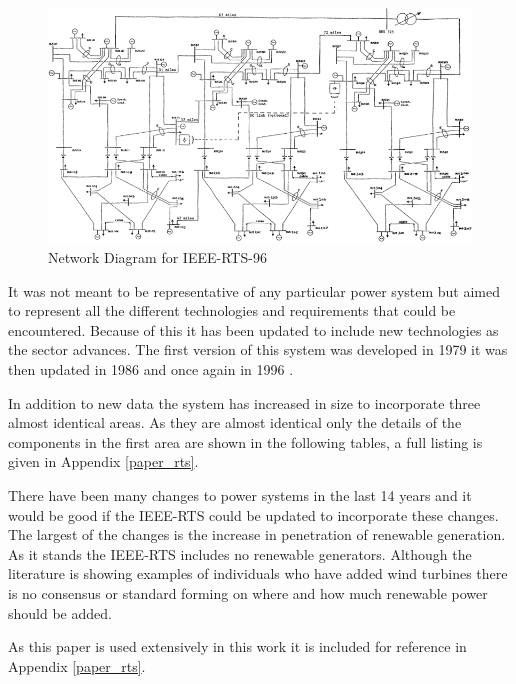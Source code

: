 \documentclass[a4paper,oneside,12pt]{report}
\begin{document}
  \begin{figure}
    \begin{center}
      \includegraphics[scale=0.8]{rts96.png}
      \caption{Network Diagram for IEEE-RTS-96 \cite{Grigg1999}}
      \label{rts96}
    \end{center}
  \end{figure}

It was not meant to be representative of any particular power system but aimed to represent all the different technologies and requirements that could be encountered. Because of this it has been updated to include new technologies as the sector advances. The first version of this system was developed in 1979 \cite{IEEERTSTaskForceofAPMSubcommittee1979} it was then updated in 1986 \cite{Allan1986} and once again in 1996 \cite{Grigg1999}.

In addition to new data the system has increased in size to incorporate three almost identical areas. As they are almost identical only the details of the components in the first area are shown in the following tables, a full listing is given in Appendix \ref{paper_rts}.

There have been many changes to power systems in the last 14 years and it would be good if the IEEE-RTS could be updated to incorporate these changes. The largest of the changes is the increase in penetration of renewable generation. As it stands the IEEE-RTS includes no renewable generators. Although the literature is showing examples of individuals who have added wind turbines there is no consensus or standard forming on where and how much renewable power should be added.

As this paper is used extensively in this work it is included for reference in Appendix \ref{paper_rts}.
\end{document}
